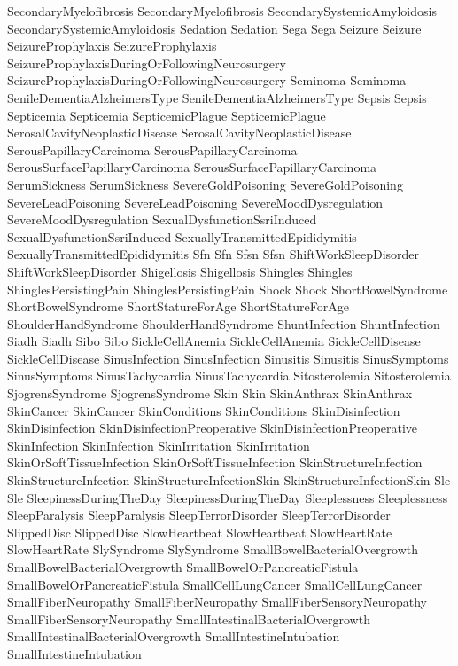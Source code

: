  SecondaryMyelofibrosis
 SecondaryMyelofibrosis
 SecondarySystemicAmyloidosis
 SecondarySystemicAmyloidosis
 Sedation
 Sedation
 Sega
 Sega
 Seizure
 Seizure
 SeizureProphylaxis
 SeizureProphylaxis
 SeizureProphylaxisDuringOrFollowingNeurosurgery
 SeizureProphylaxisDuringOrFollowingNeurosurgery
 Seminoma
 Seminoma
 SenileDementiaAlzheimersType
 SenileDementiaAlzheimersType
 Sepsis
 Sepsis
 Septicemia
 Septicemia
 SepticemicPlague
 SepticemicPlague
 SerosalCavityNeoplasticDisease
 SerosalCavityNeoplasticDisease
 SerousPapillaryCarcinoma
 SerousPapillaryCarcinoma
 SerousSurfacePapillaryCarcinoma
 SerousSurfacePapillaryCarcinoma
 SerumSickness
 SerumSickness
 SevereGoldPoisoning
 SevereGoldPoisoning
 SevereLeadPoisoning
 SevereLeadPoisoning
 SevereMoodDysregulation
 SevereMoodDysregulation
 SexualDysfunctionSsriInduced
 SexualDysfunctionSsriInduced
 SexuallyTransmittedEpididymitis
 SexuallyTransmittedEpididymitis
 Sfn
 Sfn
 Sfsn
 Sfsn
 ShiftWorkSleepDisorder
 ShiftWorkSleepDisorder
 Shigellosis
 Shigellosis
 Shingles
 Shingles
 ShinglesPersistingPain
 ShinglesPersistingPain
 Shock
 Shock
 ShortBowelSyndrome
 ShortBowelSyndrome
 ShortStatureForAge
 ShortStatureForAge
 ShoulderHandSyndrome
 ShoulderHandSyndrome
 ShuntInfection
 ShuntInfection
 Siadh
 Siadh
 Sibo
 Sibo
 SickleCellAnemia
 SickleCellAnemia
 SickleCellDisease
 SickleCellDisease
 SinusInfection
 SinusInfection
 Sinusitis
 Sinusitis
 SinusSymptoms
 SinusSymptoms
 SinusTachycardia
 SinusTachycardia
 Sitosterolemia
 Sitosterolemia
 SjogrensSyndrome
 SjogrensSyndrome
 Skin
 Skin
 SkinAnthrax
 SkinAnthrax
 SkinCancer
 SkinCancer
 SkinConditions
 SkinConditions
 SkinDisinfection
 SkinDisinfection
 SkinDisinfectionPreoperative
 SkinDisinfectionPreoperative
 SkinInfection
 SkinInfection
 SkinIrritation
 SkinIrritation
 SkinOrSoftTissueInfection
 SkinOrSoftTissueInfection
 SkinStructureInfection
 SkinStructureInfection
 SkinStructureInfectionSkin
 SkinStructureInfectionSkin
 Sle
 Sle
 SleepinessDuringTheDay
 SleepinessDuringTheDay
 Sleeplessness
 Sleeplessness
 SleepParalysis
 SleepParalysis
 SleepTerrorDisorder
 SleepTerrorDisorder
 SlippedDisc
 SlippedDisc
 SlowHeartbeat
 SlowHeartbeat
 SlowHeartRate
 SlowHeartRate
 SlySyndrome
 SlySyndrome
 SmallBowelBacterialOvergrowth
 SmallBowelBacterialOvergrowth
 SmallBowelOrPancreaticFistula
 SmallBowelOrPancreaticFistula
 SmallCellLungCancer
 SmallCellLungCancer
 SmallFiberNeuropathy
 SmallFiberNeuropathy
 SmallFiberSensoryNeuropathy
 SmallFiberSensoryNeuropathy
 SmallIntestinalBacterialOvergrowth
 SmallIntestinalBacterialOvergrowth
 SmallIntestineIntubation
 SmallIntestineIntubation
